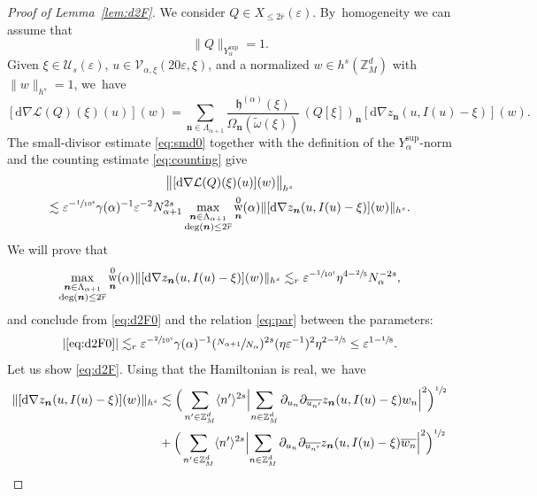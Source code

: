 \documentclass[10pt,a4paper]{amsart}
\DeclareMathOperator{\rw}{w}
\theoremstyle{plain}
\theoremstyle{definition}
\newcommand{\nb}{{\boldsymbol n}}
\newcommand{\Z}{\mathbb{Z}}
\newcommand{\1}{\mathbf{1}}
\newcommand{\Ysup}[1]{Y_{#1}^{\mathrm{sup}}}
\let\epsilon\varepsilon
\begin{document}
\begin{proof}[Proof of Lemma~\ref{lem:d2F}]
We consider $Q\in X_{\leq2\overline{r}}(\epsilon)$. By~homogeneity we can assume that
\[
\|Q\|_{\Ysup{\alpha}}=1.
\]
Given $\xi\in\mathcal{U}_{s}(\epsilon)$, $u\in\mathcal{V}_{\alpha,\xi}(20\epsilon,\xi)$, and a normalized $w\in h^{s}(\Z_{M}^{d})$ with $\|w\|_{h^{s}}=1$, we~have
\[
[\mathrm{d}\nabla \mathcal{L}(Q)(\xi)(u)](w) = \sum_{\nb\in\Lambda_{\alpha+1}}\frac{\mathfrak{h}^{(\alpha)}(\xi)}{\Omega_{\nb}(\widetilde{\omega}(\xi))}\,(Q[\xi])_{\nb}[\mathrm{d}\nabla z_{\nb}(u,I(u)-\xi)](w).
\]
The small-divisor estimate \eqref{eq:smd0} together with the definition of the $\Ysup{\alpha}$-norm and the counting estimate \eqref{eq:counting} give
\begin{multline}
\label{eq:d2F0}
\bigl\|[\mathrm{d}\nabla \mathcal{L}(Q)(\xi)(u)](w)\bigr\|_{h^{s}}
\\
\lesssim \epsilon^{-\sfrac{1}{10^{4}}}\gamma(\alpha)^{-1}\epsilon^{-2}N_{\alpha+1}^{2s}
\max_{\substack{\nb\in\Lambda_{\alpha+1}\\ \deg(\nb)\leq 2\overline{r}}}
\rw_{\nb}^{0}(\alpha)
\|
[\mathrm{d}\nabla z_{\nb}(u,I(u)-\xi)](w)
\|_{h^{s}}.
\end{multline}
We will prove that
\begin{equation}
\label{eq:d2F}
\max_{\substack{\nb\in\Lambda_{\alpha+1}\\ \deg(\nb)\leq 2\overline{r}}}
\rw_{\nb}^{0}(\alpha)
\|
[\mathrm{d}\nabla z_{\nb}(u,I(u)-\xi)](w)
\|_{h^{s}}
\lesssim_{r}\epsilon^{-\sfrac{1}{10^{4}}}\eta^{4-\sfrac{2}{5}}N_{\alpha}^{-2s},
\end{equation}
and conclude from \eqref{eq:d2F0} and the relation \eqref{eq:par} between the parameters:
\[
|\eqref{eq:d2F0}|
\lesssim_{r}\epsilon^{-\sfrac{2}{10^{4}}}\gamma(\alpha)^{-1}
(\sfrac{N_{\alpha+1}}{N_{\alpha}})^{2s}(\eta\epsilon^{-1})^{2}\eta^{2-\sfrac{2}{5}}
\leq \epsilon^{1-\sfrac{1}{8}}.
\]
Let us show \eqref{eq:d2F}. Using that the Hamiltonian is real, we~have
\begin{align}
\nonumber
\|
[\mathrm{d}\nabla z_{\nb}(u,I(u)-\xi)](w)
\|_{h^{s}}
&\lesssim
\Big(\sum_{n'\in\Z_{M}^{d}}\langle n'\rangle^{2s}\Bigl|\sum_{n\in\Z_{M}^{d}} \partial_{u_{n}}\partial_{\overline{u_{n'}}}
z_{\nb}(u,I(u)-\xi)w_{n}\Bigr|^2
\Big)^{\sfrac{1}{2}} \\
\nonumber
&+
\Big(\sum_{n'\in\Z_{M}^{d}}\langle n'\rangle^{2s}\Bigl|\sum_{n\in\Z_{M}^{d}} \partial_{u_{n}}\partial_{\overline{u_{n'}}}
z_{\nb}(u,I(u)-\xi)\overline{w_{n}}\Bigr|^2
\Big)^{\sfrac{1}{2}} \\

\end{align}
\end{proof}
\end{document}
